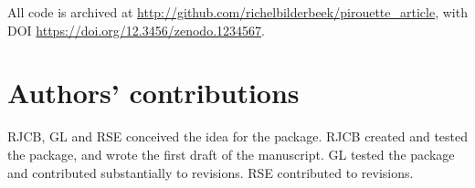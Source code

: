 \documentclass{article}
\begin{document}
All code is archived at \url{http://github.com/richelbilderbeek/pirouette_article},
with DOI \url{https://doi.org/12.3456/zenodo.1234567}.

\section{Authors' contributions}

RJCB, GL and RSE conceived the idea for the package. 
RJCB created and tested the package, and wrote the first draft of the manuscript.
GL tested the package and contributed substantially to revisions.
RSE contributed to revisions.



\end{document}
